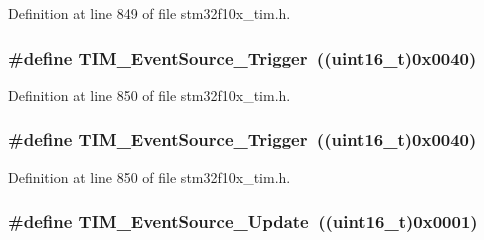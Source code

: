 Definition at line 849 of file stm32f10x\+\_\+tim.\+h.

\subsubsection[{\texorpdfstring{T\+I\+M\+\_\+\+Event\+Source\+\_\+\+Trigger}{TIM_EventSource_Trigger}}]{\setlength{\rightskip}{0pt plus 5cm}\#define T\+I\+M\+\_\+\+Event\+Source\+\_\+\+Trigger~(({\bf uint16\+\_\+t})0x0040)}\hypertarget{group___t_i_m___event___source_ga24835bf5eac25eed90069208dce22564}{}\label{group___t_i_m___event___source_ga24835bf5eac25eed90069208dce22564}


Definition at line 850 of file stm32f10x\+\_\+tim.\+h.

\subsubsection[{\texorpdfstring{T\+I\+M\+\_\+\+Event\+Source\+\_\+\+Trigger}{TIM_EventSource_Trigger}}]{\setlength{\rightskip}{0pt plus 5cm}\#define T\+I\+M\+\_\+\+Event\+Source\+\_\+\+Trigger~(({\bf uint16\+\_\+t})0x0040)}\hypertarget{group___t_i_m___event___source_ga24835bf5eac25eed90069208dce22564}{}\label{group___t_i_m___event___source_ga24835bf5eac25eed90069208dce22564}


Definition at line 850 of file stm32f10x\+\_\+tim.\+h.

\subsubsection[{\texorpdfstring{T\+I\+M\+\_\+\+Event\+Source\+\_\+\+Update}{TIM_EventSource_Update}}]{\setlength{\rightskip}{0pt plus 5cm}\#define T\+I\+M\+\_\+\+Event\+Source\+\_\+\+Update~(({\bf uint16\+\_\+t})0x0001)}\hypertarget{group___t_i_m___event___source_ga5bff72fbe94b1ae5a710e402c9868b23}{}\label{group___t_i_m___event___source_ga5bff72fbe94b1ae5a710e402c9868b23}


